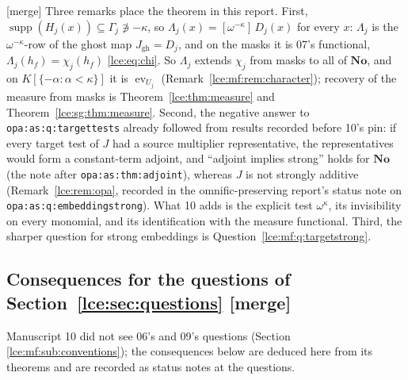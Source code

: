 \documentclass[11pt,letterpaper]{article}
\numberwithin{equation}{section}
\theoremstyle{definition}
\theoremstyle{remark}
\newcommand{\No}{\mathbf{No}}
\newcommand{\supp}{\operatorname{supp}}
\newcommand{\Gam}{\Gamma_j}
\newcommand{\coef}[2]{[\omega^{#1}]\,#2}
\newcommand{\thref}[1]{Theorem~\ref{#1}}
\newcommand{\mergetag}{\textup{\textsf{\small[merge]}}}%
\newcommand{\lbl}[1]{\nolinkurl{#1}}%
\newcommand{\ev}{\operatorname{ev}}
\newcommand{\gh}{\mathrm{gh}}
\begin{document}
\mergetag{} Three remarks place the theorem in this report. First,
$\supp(H_j(x))\subseteq\Gam\not\ni-\kappa$, so
$\Lambda_j(x)=\coef{-\kappa}{D_j(x)}$ for every $x$: $\Lambda_j$ is the
$\omega^{-\kappa}$-row of the ghost map $J_{\gh}=D_j$, and on the masks it
is 07's functional, $\Lambda_j(h_f)=\chi_j(h_f)$ \eqref{lce:eq:chi}. So
$\Lambda_j$ extends $\chi_j$ from masks to all of $\No$, and on
$K[\{-\alpha:\alpha<\kappa\}]$ it is $\ev_{U_j}$
(Remark~\ref{lce:mf:rem:character}); recovery of the measure from masks is
\thref{lce:thm:measure} and \thref{lce:sg:thm:measure}. Second, the negative
answer to \lbl{opa:as:q:targettests} already followed from results recorded
before 10's pin: if every target test of $J$ had a source multiplier
representative, the representatives would form a constant-term adjoint, and
``adjoint implies strong'' holds for $\No$ (the note after
\lbl{opa:as:thm:adjoint}), whereas $J$ is not strongly additive
(Remark~\ref{lce:rem:opa}, recorded in the omnific-preserving report's status
note on \lbl{opa:as:q:embeddingstrong}). What 10 adds is the explicit test
$\omega^\kappa$, its invisibility on every monomial, and its identification
with the measure functional. Third, the sharper question for strong
embeddings is Question~\ref{lce:mf:q:targetstrong}.

\subsection{Consequences for the questions of Section~\ref{lce:sec:questions} \mergetag}
\label{lce:mf:sub:consequences}

Manuscript 10 did not see 06's and 09's questions (Section
\ref{lce:mf:sub:conventions}); the consequences below are deduced here from
its theorems and are recorded as status notes at the questions.
\end{document}
